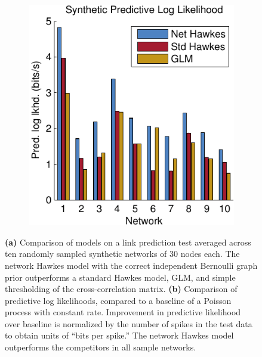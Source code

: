 \begin{figure}[t]
\begin{center}
\begin{subfigure}[T]{.4\textwidth}
    \includegraphics[width=\textwidth]{figures/ch3/synth_pred_ll}
    \label{fig:synth_pred_ll}
  \end{subfigure}
  \end{center}
  \vspace{-1em}
  \caption[Synthetic link prediction and predictive log likelihood]{
    \textbf{(a)} Comparison of models on a link prediction test
    averaged across ten randomly sampled synthetic networks of 30
    nodes each. The network Hawkes model with the correct
    independent Bernoulli graph prior outperforms a standard Hawkes model,
    GLM, and simple thresholding of the cross-correlation matrix.
    \textbf{(b)} Comparison of predictive log likelihoods, compared to
    a baseline of a Poisson process with constant rate. Improvement in
    predictive likelihood over baseline is normalized by the number of
    spikes in the test data to obtain units of ``bits per spike.'' The
    network Hawkes model outperforms the competitors in all sample
    networks.}
\end{figure}

